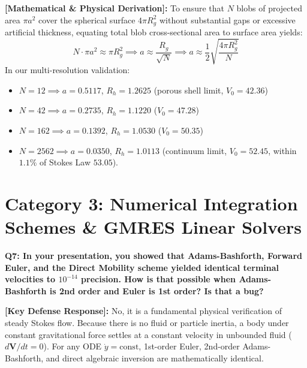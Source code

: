 \documentclass[11pt,a4paper]{article}
\newcommand{\question}[2]{
    \vspace{0.4cm}
    \noindent\colorbox{blue!10}{\parbox{\dimexpr\textwidth-2\fboxsep\relax}{
        \textbf{#1: #2}
    }}
    \vspace{0.2cm}
}
\newcommand{\shortanswer}[1]{
    \noindent\textbf{\textcolor{green!50!black}{[Key Defense Response]:}} #1
    \vspace{0.2cm}
}
\newcommand{\deepdetails}[1]{
    \noindent\textbf{\textcolor{blue!60!black}{[Mathematical \& Physical Derivation]:}} #1
    \vspace{0.2cm}
}
\begin{document}
\deepdetails{
To ensure that $N$ blobs of projected area $\pi a^2$ cover the spherical surface $4\pi R_g^2$ without substantial gaps or excessive artificial thickness, equating total blob cross-sectional area to surface area yields:
\begin{equation}
    N \cdot \pi a^2 \approx \pi R_g^2 \implies a \approx \frac{R_g}{\sqrt{N}} \implies a \approx \frac{1}{2} \sqrt{\frac{4\pi R_g^2}{N}}
\end{equation}
In our multi-resolution validation:
\begin{itemize}
    \item $N = 12 \implies a = 0.5117$, $R_h = 1.2625$ (porous shell limit, $V_0 = 42.36$)
    \item $N = 42 \implies a = 0.2735$, $R_h = 1.1220$ ($V_0 = 47.28$)
    \item $N = 162 \implies a = 0.1392$, $R_h = 1.0530$ ($V_0 = 50.35$)
    \item $N = 2562 \implies a = 0.0350$, $R_h = 1.0113$ (continuum limit, $V_0 = 52.45$, within $1.1\%$ of Stokes Law $53.05$).
\end{itemize}
}

\section{Category 3: Numerical Integration Schemes \& GMRES Linear Solvers}

\question{Q7}{In your presentation, you showed that Adams-Bashforth, Forward Euler, and the Direct Mobility scheme yielded identical terminal velocities to $10^{-14}$ precision. How is that possible when Adams-Bashforth is 2nd order and Euler is 1st order? Is that a bug?}

\shortanswer{No, it is a fundamental physical verification of steady Stokes flow. Because there is no fluid or particle inertia, a body under constant gravitational force settles at a constant velocity in unbounded fluid ($d\mathbf{V}/dt = 0$). For any ODE $\dot{y} = \text{const}$, 1st-order Euler, 2nd-order Adams-Bashforth, and direct algebraic inversion are mathematically identical.}
\end{document}
